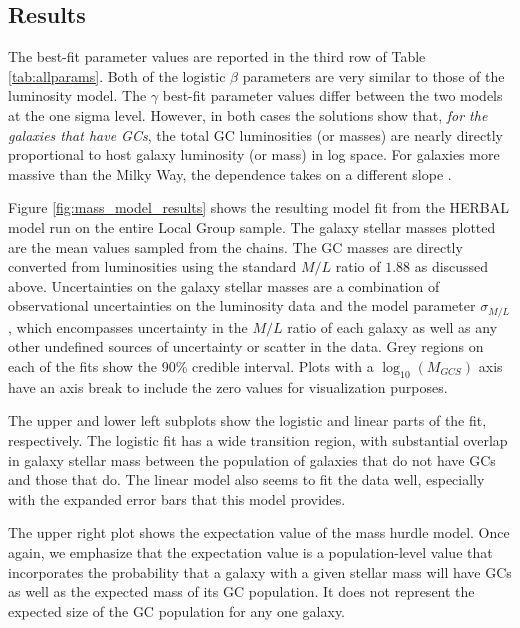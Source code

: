 \documentclass[twocolumn]{aastex631}
\begin{document}
\subsection{Results} \label{subsec:mass_results}

The best-fit parameter values are reported in the third row of Table \ref{tab:allparams}. Both of the logistic $\beta$ parameters are very similar to those of the luminosity model. The $\gamma$ best-fit parameter values differ between the two models at the one sigma level. However, in both cases the solutions show that, \emph{for the galaxies that have GCs}, the total  GC luminosities (or masses) are nearly directly proportional to host galaxy luminosity (or mass) in log space.  For galaxies more massive than the Milky Way, the dependence takes on a different slope \citep{Harris2013}.

Figure \ref{fig:mass_model_results} shows the resulting model fit from the HERBAL model run on the entire Local Group sample. The galaxy stellar masses plotted are the mean values sampled from the chains. The GC masses are directly converted from luminosities using the standard $M/L$ ratio of $1.88$ as discussed above. Uncertainties on the galaxy stellar masses are a combination of observational uncertainties on the luminosity data and the model parameter $\sigma_{M/L}$, which encompasses uncertainty in the $M/L$ ratio of each galaxy as well as any other undefined sources of uncertainty or scatter in the data. Grey regions on each of the fits show the 90\% credible interval. Plots with a $\log_{10}(M_{GCS})$ axis have an axis break to include the zero values for visualization purposes.

The upper and lower left subplots show the logistic and linear parts of the fit, respectively. The logistic fit has a wide transition region, with substantial overlap in galaxy stellar mass between the population of galaxies that do not have GCs and those that do. The linear model also seems to fit the data well, especially with the expanded error bars that this model provides.

The upper right plot shows the expectation value of the mass hurdle model. Once again, we emphasize that the expectation value is a population-level value that incorporates the probability that a galaxy with a given stellar mass will have GCs as well as the expected mass of its GC population. It does not represent the expected size of the GC population for any one galaxy.
\end{document}
